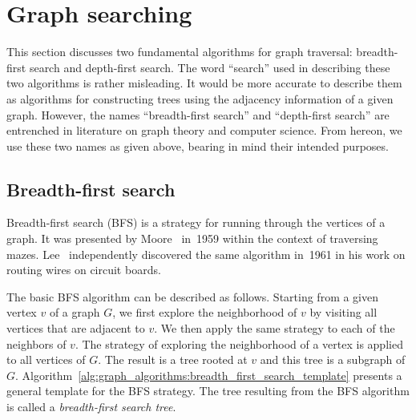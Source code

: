 
\section{Graph searching}
\label{sec:graph_algorithms:graph_searching}

This section discusses two fundamental algorithms for graph
traversal: breadth-first
search and depth-first
search. The word ``search'' used in
describing these two algorithms is rather misleading. It would be more
accurate to describe them as algorithms for constructing trees using
the adjacency information of a given graph. However, the names
``breadth-first search'' and ``depth-first search'' are entrenched in
literature on graph theory and computer science. From hereon, we use
these two names as given above, bearing in mind their intended
purposes.



\subsection{Breadth-first search}

Breadth-first search (BFS) is a
strategy for running through the vertices of a graph. It was presented
by Moore~\cite{Moore1959} in~1959 within the
context of traversing mazes.
Lee~\cite{Lee1961} independently discovered the same
algorithm in~1961 in his work on routing wires on circuit
boards.

The basic BFS algorithm can be described as
follows. Starting from a given vertex $v$ of a graph $G$, we first
explore the neighborhood of $v$ by visiting all vertices that are
adjacent to $v$. We then apply the same strategy to each of the
neighbors of $v$. The strategy of exploring the neighborhood of a
vertex is applied to all vertices of $G$. The result is a
tree rooted at $v$ and this tree is a
subgraph of $G$.
Algorithm~\ref{alg:graph_algorithms:breadth_first_search_template}
presents a general template for the BFS strategy. The tree
resulting from the BFS algorithm is called a
\emph{breadth-first search tree}.

